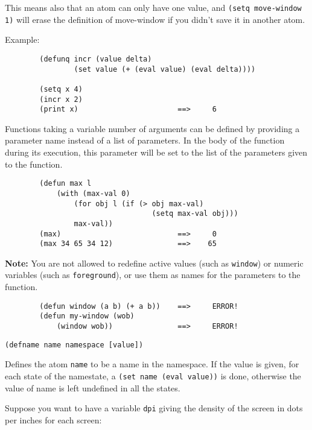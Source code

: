 This means also that an atom can only have one value, and {\tt (setq
move-window 1)} will erase the definition of move-window if you didn't save
it in another atom.

Example:{\exemplefont\upspace\begin{verbatim}
        (defunq incr (value delta)
                (set value (+ (eval value) (eval delta))))

        (setq x 4)
        (incr x 2)
        (print x)                       ==>     6
\end{verbatim}}

Functions taking a variable number of arguments can be defined by
providing a parameter name instead of a list of parameters. In the
body of the function during its execution, this parameter will be set
to the list of the parameters given to the function.

{\exemplefont\begin{verbatim}
        (defun max l
            (with (max-val 0) 
                (for obj l (if (> obj max-val)
                                  (setq max-val obj)))
                max-val))
        (max)                           ==>     0
        (max 34 65 34 12)               ==>    65
\end{verbatim}}

{\bf Note:} You are not allowed to redefine active values (such as
\verb"window") or numeric variables (such as \verb"foreground"), or use
them as names for the parameters to the function.

{\exemplefont\begin{verbatim}
        (defun window (a b) (+ a b))    ==>     ERROR!
        (defun my-window (wob) 
            (window wob))               ==>     ERROR!
\end{verbatim}}


{\usagefont\begin{verbatim}
(defname name namespace [value])
\end{verbatim}}\usageupspace

Defines the atom \verb"name" to be a name in the namespace. If the value is
given, for each state of the namestate, a \verb"(set name (eval value))" is
done, otherwise the value of name is left undefined in all the states.

Suppose you want to have a variable \verb"dpi" giving the density of the
screen in dots per inches for each screen:

